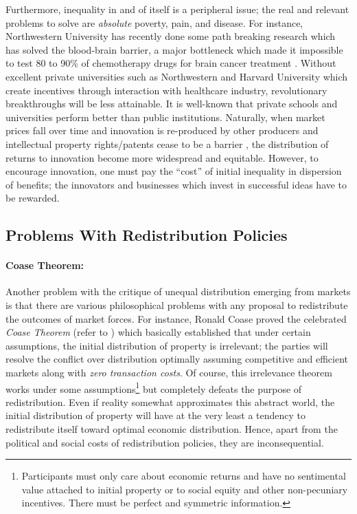 \documentclass[12pt]{article}
\newcommand{\1}{\mathbbm 1}
\begin{document}
Furthermore, inequality in and of itself is a peripheral issue; the real and relevant problems to solve are \textit{absolute} poverty, pain, and disease. For instance, Northwestern University has recently done some path breaking research which has solved the blood-brain barrier, a major bottleneck which made it impossible to test 80 to 90\% of chemotherapy drugs for brain cancer treatment \cite{schoen2022towards}. Without excellent private universities such as Northwestern and Harvard University which create incentives through interaction with healthcare industry, revolutionary breakthroughs will be less attainable. It is well-known that private schools and universities perform better than public institutions. Naturally, when market prices fall over time and innovation is re-produced by other producers and intellectual property rights/patents cease to be a barrier \cite{kanwar2006innovation}, the distribution of returns to innovation become more widespread and equitable. However, to encourage innovation, one must pay the ``cost'' of initial inequality in dispersion of benefits; the innovators and businesses which invest in successful ideas have to be rewarded.





			
		
	
		\subsection{Problems With Redistribution Policies}
		
		
		\paragraph{Coase Theorem:} Another problem with the critique of unequal distribution emerging from markets is that there are various philosophical problems with any proposal to redistribute the outcomes of market forces. For instance, Ronald Coase proved the celebrated \textit{Coase Theorem} (refer to \cite{coase1981coase}) which basically established that under certain assumptions, the initial distribution of property is irrelevant; the parties will resolve the conflict over distribution optimally assuming competitive and efficient markets along with \textit{zero transaction costs}. Of course, this irrelevance theorem works under some assumptions\footnote{Participants must only care about economic returns and have no sentimental value attached to initial property or to social equity and other non-pecuniary incentives. There must be perfect and symmetric information.} but completely defeats the purpose of redistribution. Even if reality somewhat approximates this abstract world, the initial distribution of property will have at the very least a tendency to redistribute itself toward optimal economic distribution. Hence, apart from the political and social costs of redistribution policies, they are inconsequential. 
		
\end{document}

